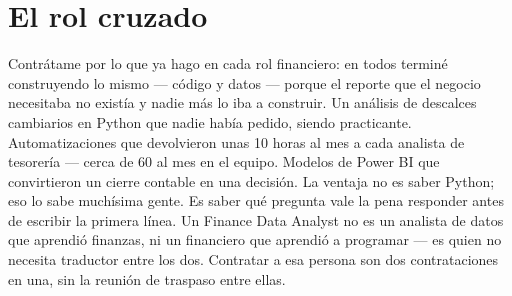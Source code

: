 \documentclass[a4paper,10pt]{article}
\begin{document}
\section*{El rol cruzado}
Contrátame por lo que ya hago en cada rol financiero: en todos terminé construyendo lo mismo --- código y datos --- porque el reporte que el negocio necesitaba no existía y nadie más lo iba a construir. Un análisis de descalces cambiarios en Python que nadie había pedido, siendo practicante. Automatizaciones que devolvieron unas 10 horas al mes a cada analista de tesorería --- cerca de 60 al mes en el equipo. Modelos de Power BI que convirtieron un cierre contable en una decisión. La ventaja no es saber Python; eso lo sabe muchísima gente. Es saber qué pregunta vale la pena responder antes de escribir la primera línea. Un Finance Data Analyst no es un analista de datos que aprendió finanzas, ni un financiero que aprendió a programar --- es quien no necesita traductor entre los dos. Contratar a esa persona son dos contrataciones en una, sin la reunión de traspaso entre ellas.
\end{document}
